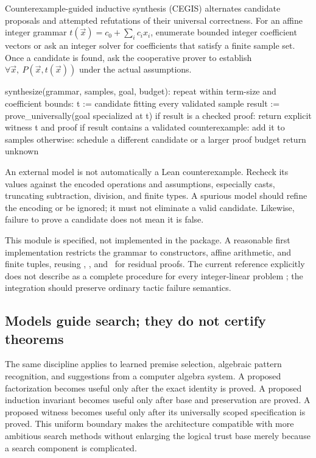 Counterexample-guided inductive synthesis (CEGIS) alternates candidate proposals
and attempted refutations of their universal correctness. For an affine
integer grammar $t(\vec x)=c_0+\sum_i c_i x_i$, enumerate bounded integer
coefficient vectors or ask an integer solver for coefficients that satisfy a
finite sample set. Once a candidate is found, ask the cooperative prover to
establish $\forall\vec x,\ P(\vec x,t(\vec x))$ under the actual assumptions.

\begin{Code}
synthesize(grammar, samples, goal, budget):
  repeat within term-size and coefficient bounds:
    t := candidate fitting every validated sample
    result := prove_universally(goal specialized at t)
    if result is a checked proof:
      return explicit witness t and proof
    if result contains a validated counterexample:
      add it to samples
    otherwise:
      schedule a different candidate or a larger proof budget
  return unknown
\end{Code}

An external model is not automatically a Lean counterexample. Recheck its
values against the encoded operations and assumptions, especially casts,
truncating subtraction, division, and finite types. A spurious model should
refine the encoding or be ignored; it must not eliminate a valid candidate.
Likewise, failure to prove a candidate does not mean it is false.

This module is specified, not implemented in the package. A reasonable first
implementation restricts the grammar to constructors, affine arithmetic, and
finite tuples, reusing , , and \grind\ for residual
proofs. The current reference explicitly does not describe  as a
complete procedure for every integer-linear problem \cite{lean-tactics}; the
integration should preserve ordinary tactic failure semantics.

\subsection{Models guide search; they do not certify theorems}

The same discipline applies to learned premise selection, algebraic pattern
recognition, and suggestions from a computer algebra system. A proposed
factorization becomes useful only after the exact identity is proved. A
proposed induction invariant becomes useful only after base and preservation
are proved. A proposed witness becomes useful only after its universally
scoped specification is proved. This uniform boundary makes the architecture
compatible with more ambitious search methods without enlarging the logical
trust base merely because a search component is complicated.
